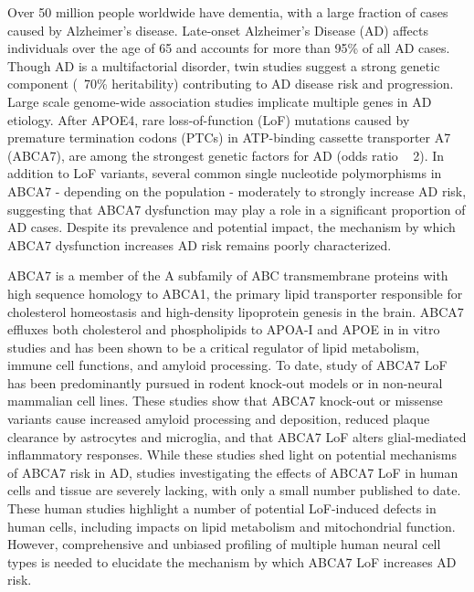 Over 50 million people worldwide have dementia, with a large fraction of cases caused by Alzheimer’s disease\cite{Alzheimers_Disease_International2020-xv}. Late-onset Alzheimer’s Disease (AD) affects individuals over the age of 65 and accounts for more than 95\% of all AD cases\cite{Alzheimers_Association2016-vq}. Though AD is a multifactorial disorder, twin studies suggest a strong genetic component (~70\% heritability)\cite{Karlsson2022-vv} contributing to AD disease risk and progression. Large scale genome-wide association studies implicate multiple genes in AD etiology\cite{Lambert2013-km,Marioni2019-os,Jansen2019-ww,Kunkle2019-yo,De_Rojas2021-gu,Wightman2021-km,Bellenguez2022-ao,Belloy2023-kj}. After APOE4, rare loss-of-function (LoF) mutations caused by premature termination codons (PTCs) in ATP-binding cassette transporter A7 (ABCA7), are among the strongest genetic factors for AD (odds ratio ~ 2)\cite{Steinberg2015-mu,De_Roeck2019-te,Reitz2013-eo,Bellenguez2022-ao,Holstege2022-vp,Lyssenko2021-gw}. In addition to LoF variants, several common single nucleotide polymorphisms in ABCA7 - depending on the population - moderately\cite{Steinberg2015-mu,De_Roeck2019-te,Reitz2013-eo,Bellenguez2022-ao,Le_Guennec2016-nl,Hollingworth2011-tr,Naj2011-bs} to strongly\cite{Reitz2013-eo} increase AD risk, suggesting that ABCA7 dysfunction may play a role in a significant proportion of AD cases. Despite its prevalence and potential impact, the mechanism by which ABCA7 dysfunction increases AD risk remains poorly characterized. 

ABCA7 is a member of the A subfamily of ABC transmembrane proteins\cite{Kim2008-zi} with high sequence homology to ABCA1, the primary lipid transporter responsible for cholesterol homeostasis and high-density lipoprotein genesis in the brain\cite{Koldamova2014-kd}. ABCA7 effluxes both cholesterol and phospholipids to APOA-I and APOE in in vitro studies\cite{Abe-Dohmae2004-wb,Wang2003-wh,Tomioka2017-nv,Picataggi2022-yp,Quazi2013-pe} and has been shown to be a critical regulator of lipid metabolism, immune cell functions, and amyloid processing\cite{Aikawa2018-ek,Tanaka2011-zo,Duchateau2023-ji,Kawatani2023-vf,Tayran2024-bo}. To date, study of ABCA7 LoF has been predominantly pursued in rodent knock-out models or in non-neural mammalian cell lines. These studies show that ABCA7 knock-out or missense variants  cause increased amyloid processing and deposition\cite{Satoh2015-yu,Sakae2016-uy,Chan2008-qu,Bamji-Mirza2018-xt}, reduced plaque clearance by astrocytes and microglia\cite{Kim2013-sv,Fu2016-qe}, and that ABCA7 LoF alters glial-mediated inflammatory responses\cite{Aikawa2019-hv,Aikawa2021-vz}.  While these studies shed light on potential mechanisms of ABCA7 risk in AD, studies investigating the effects of ABCA7 LoF in human cells and tissue are severely lacking, with only a small number published to date\cite{Kawatani2023-vf,Allen2017-vw,Liu2021-zh,Bamji-Mirza2018-xt}.  These human studies highlight a number of potential LoF-induced defects in human cells, including impacts on lipid metabolism and mitochondrial function\cite{Kawatani2023-vf}. However, comprehensive and unbiased profiling of multiple human neural cell types is needed to elucidate the mechanism by which ABCA7 LoF increases AD risk.

